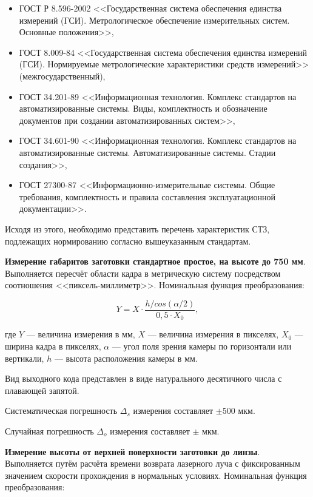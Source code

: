 \begin{itemize}
	\item ГОСТ Р 8.596-2002 <<Государственная система обеспечения единства измерений (ГСИ). Метрологическое обеспечение измерительных систем. Основные положения>>,
	\item ГОСТ 8.009-84 <<Государственная система обеспечения единства измерений (ГСИ). Нормируемые метрологические характеристики средств измерений>> (межгосударственный),
	\item ГОСТ 34.201-89 <<Информационная технология. Комплекс стандартов на автоматизированные системы. Виды, комплектность и обозначение документов при создании автоматизированных систем>>,
	\item ГОСТ 34.601-90 <<Информационная технология. Комплекс стандартов на автоматизированные системы. Автоматизированные системы. Стадии создания>>,
	\item ГОСТ 27300-87 <<Информационно-измерительные системы. Общие требования, комплектность и правила составления эксплуатационной документации>>.
\end{itemize}

Исходя из этого, необходимо представить перечень характеристик СТЗ, подлежащих нормированию согласно вышеуказанным стандартам.

\textbf{Измерение габаритов заготовки стандартное простое, на высоте до 750 мм}. Выполняется пересчёт области кадра в метрическую систему посредством соотношения <<пиксель-миллиметр>>. Номинальная функция преобразования:

\begin{equation}
Y = X \cdot \frac{h / cos (\alpha / 2)}{0,5 \cdot X_0},
\label{eq_3_21}
\end{equation}

где $Y$ --- величина измерения в мм, $X$ --- величина измерения в пикселях, $X_0$ --- ширина кадра в пикселях, $\alpha$ --- угол поля зрения камеры по горизонтали или вертикали, $h$ --- высота расположения камеры в мм.

Вид выходного кода представлен в виде натурального десятичного числа с плавающей запятой.

Систематическая погрешность $\Delta_s$ измерения составляет $\pm$500 мкм.

Случайная погрешность $\Delta_o$ измерения составляет $\pm$ мкм.

\textbf{Измерение высоты от верхней поверхности заготовки до линзы}. Выполняется путём расчёта времени возврата лазерного луча с фиксированным значением скорости прохождения в нормальных условиях. Номинальная функция преобразования:

